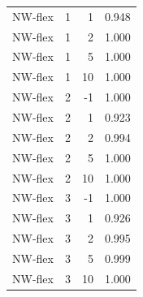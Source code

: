 \begin{table}
\begin{tabular}{lrrr}
NW-flex & 1 & 1 & 0.948 \\
NW-flex & 1 & 2 & 1.000 \\
NW-flex & 1 & 5 & 1.000 \\
NW-flex & 1 & 10 & 1.000 \\
NW-flex & 2 & -1 & 1.000 \\
NW-flex & 2 & 1 & 0.923 \\
NW-flex & 2 & 2 & 0.994 \\
NW-flex & 2 & 5 & 1.000 \\
NW-flex & 2 & 10 & 1.000 \\
NW-flex & 3 & -1 & 1.000 \\
NW-flex & 3 & 1 & 0.926 \\
NW-flex & 3 & 2 & 0.995 \\
NW-flex & 3 & 5 & 0.999 \\
NW-flex & 3 & 10 & 1.000 \\
\bottomrule
\end{tabular}
\end{table}
